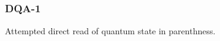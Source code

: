 \subsubsection{DQA-1}\label{sec:error_code_dqa_1}

Attempted direct read of quantum state in parenthness.
